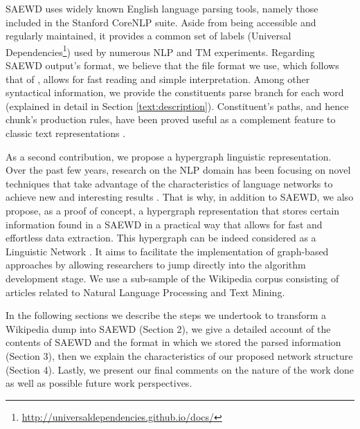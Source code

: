 SAEWD uses widely known English language parsing tools, namely those included in the Stanford CoreNLP suite.  Aside from being accessible and regularly maintained, it provides a common set of labels (Universal Dependencies\footnote{\url{http://universaldependencies.github.io/docs/}}) used by numerous NLP and TM experiments. Regarding SAEWD output's format, we believe that the file format we use, which follows  that of \cite{ATSERIAS08}, allows for fast reading and simple interpretation. Among other syntactical information, we provide the constituents parse branch for each word (explained in detail in Section \ref{text:description}). 
Constituent's paths, and hence chunk's production rules, have been proved useful as a complement feature to classic text representations \cite{sagae2009,Bergsma2012,Massung2013}. 

As a second contribution, we propose a hypergraph linguistic representation. Over the past few years, research on the NLP domain has been focusing on novel techniques that take advantage of the characteristics of language networks to achieve new and interesting results \cite{Mihalcea11}. That is why, in addition to SAEWD, we also propose, as a proof of concept, a hypergraph representation that stores certain information found in a SAEWD in a practical way that allows for fast and effortless data extraction. This hypergraph can be indeed considered as a Linguistic Network \cite{Choudhury09}.  It aims to facilitate the implementation of graph-based approaches by allowing researchers to jump directly into the algorithm development stage. We use a sub-sample of the Wikipedia corpus consisting of articles related to Natural Language Processing and Text Mining. 

In the following sections we describe the steps we undertook to transform a Wikipedia dump into SAEWD (Section 2), we give a detailed account of the contents of SAEWD and the format in which we stored the parsed information (Section 3), then we explain the characteristics of our proposed network structure (Section 4). Lastly, we present our final comments on the nature of the work done as well as possible future work perspectives.




